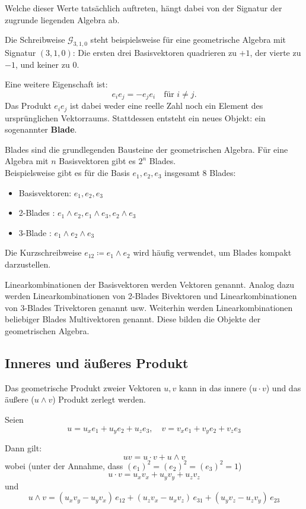 \documentclass[
	ngerman,%
	accentcolor=9c,%
	ruledheaders=section,%
	class=report,%
	thesis={type=bachelor},%
	fontsize=11pt,%
	parskip=half-,%
	custommargins=true,%
	marginpar=false,%
]{tudapub}
\begin{document}
Welche dieser Werte tatsächlich auftreten, hängt dabei von der Signatur der zugrunde liegenden Algebra ab.

Die Schreibweise \( \mathcal{G}_{3,1,0} \) steht beispielsweise für eine geometrische Algebra mit Signatur \((3,1,0)\):  
Die ersten drei Basisvektoren quadrieren zu \( +1 \), der vierte zu \( -1 \), und keiner zu \( 0 \).

Eine weitere Eigenschaft ist:  
\[
e_i e_j = - e_j e_i \quad \text{für } i \neq j.
\]
Das Produkt \( e_i e_j \) ist dabei weder eine reelle Zahl noch ein Element des ursprünglichen Vektorraums. Stattdessen entsteht ein neues Objekt: ein sogenannter \textbf{Blade}.

Blades sind die grundlegenden Bausteine der geometrischen Algebra. Für eine Algebra mit \( n \) Basisvektoren gibt es \( 2^n \) Blades. \\
Beispielsweise gibt es für die Basis \( e_1, e_2, e_3 \) insgesamt 8 Blades:

\begin{itemize}
    \item Basisvektoren: \( e_1, e_2, e_3 \)
    \item 2-Blades : \( e_1 \wedge e_2, e_1 \wedge e_3, e_2 \wedge e_3 \)
    \item 3-Blade : \( e_1 \wedge e_2 \wedge e_3 \)
\end{itemize}

Die Kurzschreibweise \( e_{12} \coloneqq e_1 \wedge e_2 \) wird häufig verwendet, um Blades kompakt \\
darzustellen.

Linearkombinationen der Basisvektoren werden Vektoren genannt. Analog dazu werden Linearkombinationen von 2-Blades Bivektoren und Linearkombinationen von 3-Blades Trivektoren genannt usw. 
Weiterhin werden Linearkombinationen beliebiger Blades Multivektoren genannt. Diese bilden die Objekte der geometrischen Algebra.

\subsection{Inneres und äußeres Produkt}
Das geometrische Produkt zweier Vektoren \(u, v\) kann in das innere (\(u \cdot v\)) und das äußere (\(u \wedge v\)) Produkt zerlegt werden.

Seien
\[
u = u_x e_1 + u_y e_2 + u_z e_3, \quad
v = v_x e_1 + v_y e_2 + v_z e_3
\]

Dann gilt:
\[
uv = u \cdot v + u \wedge v
\]
wobei (unter der Annahme, dass \((e_{1})^2=(e_{2})^2=(e_{3})^2=1\))
\[
u \cdot v = u_x v_x + u_y v_y + u_z v_z
\]
und
\[
u \wedge v =
(u_x v_y - u_y v_x)\, e_{12}
+ (u_z v_x - u_x v_z)\, e_{31}
+ (u_y v_z - u_z v_y)\, e_{23}
\]
\end{document}
